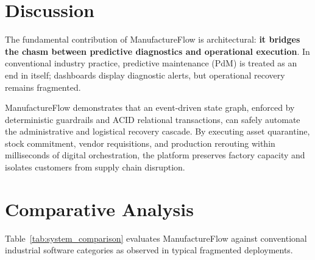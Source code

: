 \documentclass[10pt,twocolumn,a4paper]{article}
\begin{document}
\section{Discussion}
\label{sec:discussion}
The fundamental contribution of ManufactureFlow is architectural: \textbf{it bridges the chasm between predictive diagnostics and operational execution}. In conventional industry practice, predictive maintenance (PdM) is treated as an end in itself; dashboards display diagnostic alerts, but operational recovery remains fragmented. 

ManufactureFlow demonstrates that an event-driven state graph, enforced by deterministic guardrails and ACID relational transactions, can safely automate the administrative and logistical recovery cascade. By executing asset quarantine, stock commitment, vendor requisitions, and production rerouting within milliseconds of digital orchestration, the platform preserves factory capacity and isolates customers from supply chain disruption.

\section{Comparative Analysis}
\label{sec:comparison}
Table~\ref{tab:system_comparison} evaluates ManufactureFlow against conventional industrial software categories as observed in typical fragmented deployments.
\end{document}
